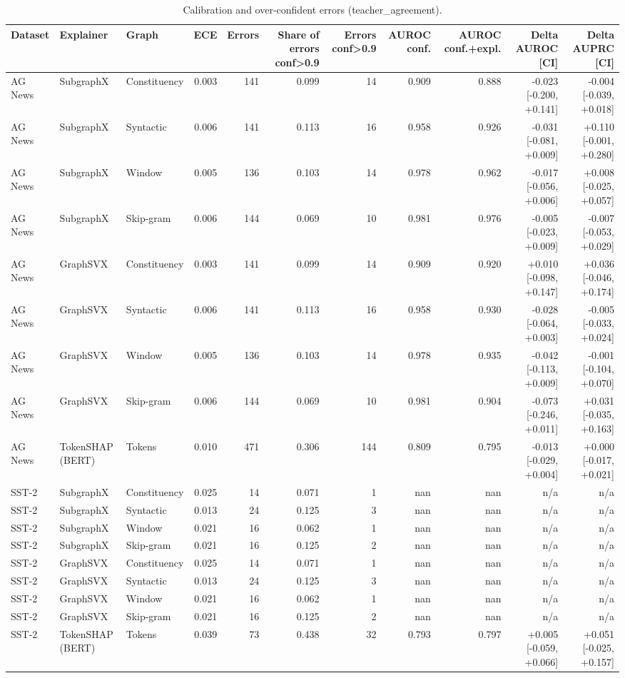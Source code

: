 \begin{table}[H]
\centering
\small
\caption{Calibration and over-confident errors (teacher_agreement).}
\label{tab:regime_teacher_agreement}
\begin{tabular}{lllrrrrrrrr}
\toprule
Dataset & Explainer & Graph & ECE & Errors & Share of errors conf>0.9 & Errors conf>0.9 & AUROC conf. & AUROC conf.+expl. & Delta AUROC [CI] & Delta AUPRC [CI] \\
\midrule
AG News & SubgraphX & Constituency & 0.003 & 141 & 0.099 & 14 & 0.909 & 0.888 & -0.023 [-0.200, +0.141] & -0.004 [-0.039, +0.018] \\
AG News & SubgraphX & Syntactic & 0.006 & 141 & 0.113 & 16 & 0.958 & 0.926 & -0.031 [-0.081, +0.009] & +0.110 [-0.001, +0.280] \\
AG News & SubgraphX & Window & 0.005 & 136 & 0.103 & 14 & 0.978 & 0.962 & -0.017 [-0.056, +0.006] & +0.008 [-0.025, +0.057] \\
AG News & SubgraphX & Skip-gram & 0.006 & 144 & 0.069 & 10 & 0.981 & 0.976 & -0.005 [-0.023, +0.009] & -0.007 [-0.053, +0.029] \\
AG News & GraphSVX & Constituency & 0.003 & 141 & 0.099 & 14 & 0.909 & 0.920 & +0.010 [-0.098, +0.147] & +0.036 [-0.046, +0.174] \\
AG News & GraphSVX & Syntactic & 0.006 & 141 & 0.113 & 16 & 0.958 & 0.930 & -0.028 [-0.064, +0.003] & -0.005 [-0.033, +0.024] \\
AG News & GraphSVX & Window & 0.005 & 136 & 0.103 & 14 & 0.978 & 0.935 & -0.042 [-0.113, +0.009] & -0.001 [-0.104, +0.070] \\
AG News & GraphSVX & Skip-gram & 0.006 & 144 & 0.069 & 10 & 0.981 & 0.904 & -0.073 [-0.246, +0.011] & +0.031 [-0.035, +0.163] \\
AG News & TokenSHAP (BERT) & Tokens & 0.010 & 471 & 0.306 & 144 & 0.809 & 0.795 & -0.013 [-0.029, +0.004] & +0.000 [-0.017, +0.021] \\
SST-2 & SubgraphX & Constituency & 0.025 & 14 & 0.071 & 1 & nan & nan & n/a & n/a \\
SST-2 & SubgraphX & Syntactic & 0.013 & 24 & 0.125 & 3 & nan & nan & n/a & n/a \\
SST-2 & SubgraphX & Window & 0.021 & 16 & 0.062 & 1 & nan & nan & n/a & n/a \\
SST-2 & SubgraphX & Skip-gram & 0.021 & 16 & 0.125 & 2 & nan & nan & n/a & n/a \\
SST-2 & GraphSVX & Constituency & 0.025 & 14 & 0.071 & 1 & nan & nan & n/a & n/a \\
SST-2 & GraphSVX & Syntactic & 0.013 & 24 & 0.125 & 3 & nan & nan & n/a & n/a \\
SST-2 & GraphSVX & Window & 0.021 & 16 & 0.062 & 1 & nan & nan & n/a & n/a \\
SST-2 & GraphSVX & Skip-gram & 0.021 & 16 & 0.125 & 2 & nan & nan & n/a & n/a \\
SST-2 & TokenSHAP (BERT) & Tokens & 0.039 & 73 & 0.438 & 32 & 0.793 & 0.797 & +0.005 [-0.059, +0.066] & +0.051 [-0.025, +0.157] \\
\bottomrule
\end{tabular}
\end{table}
